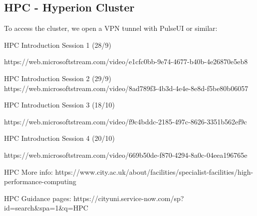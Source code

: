 \subsection{HPC - Hyperion Cluster}
To access the cluster, we open a VPN tunnel with PulseUI or similar:








HPC Introduction Session 1 (28/9)

https://web.microsoftstream.com/video/e1cfc0bb-9e74-4677-b40b-4e26870e5eb8

 

HPC Introduction Session 2 (29/9)
https://web.microsoftstream.com/video/8ad789f3-4b3d-4e4e-8e8d-f5be80b06057

 

HPC Introduction Session 3 (18/10)

https://web.microsoftstream.com/video/f9c4bddc-2185-497c-8626-3351b562ef9c

 

HPC Introduction Session 4 (20/10)

https://web.microsoftstream.com/video/669b50de-f870-4294-8a0c-04eea196765e

HPC More info:
https://www.city.ac.uk/about/facilities/specialist-facilities/high-performance-computing

HPC Guidance pages:
https://cityuni.service-now.com/sp?id=search&spa=1&q=HPC
